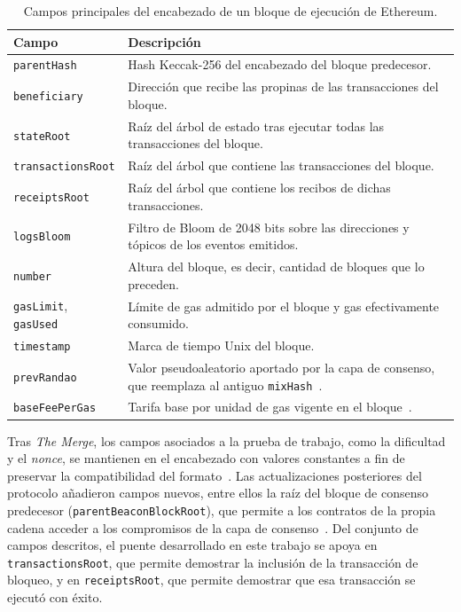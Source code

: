 \begin{table}[htbp]
	\centering
	\caption{Campos principales del encabezado de un bloque de ejecución de Ethereum.}
	\label{tab:eth_header}
	\small
	\begin{tabular}{>{\raggedright\arraybackslash}p{3.6cm} >{\raggedright\arraybackslash}p{10.6cm}}
		\toprule
		\textbf{Campo} & \textbf{Descripción} \\
		\midrule
		\texttt{parentHash} & Hash Keccak-256 del encabezado del bloque predecesor. \\
		\addlinespace
		\texttt{beneficiary} & Dirección que recibe las propinas de las transacciones del bloque. \\
		\addlinespace
		\texttt{stateRoot} & Raíz del árbol de estado tras ejecutar todas las transacciones del
		bloque. \\
		\addlinespace
		\texttt{transactionsRoot} & Raíz del árbol que contiene las transacciones del bloque. \\
		\addlinespace
		\texttt{receiptsRoot} & Raíz del árbol que contiene los recibos de dichas transacciones. \\
		\addlinespace
		\texttt{logsBloom} & Filtro de Bloom de 2048 bits sobre las direcciones y tópicos de los
		eventos emitidos. \\
		\addlinespace
		\texttt{number} & Altura del bloque, es decir, cantidad de bloques que lo preceden. \\
		\addlinespace
		\texttt{gasLimit}, \texttt{gasUsed} & Límite de gas admitido por el bloque y gas
		efectivamente consumido. \\
		\addlinespace
		\texttt{timestamp} & Marca de tiempo Unix del bloque. \\
		\addlinespace
		\texttt{prevRandao} & Valor pseudoaleatorio aportado por la capa de consenso, que reemplaza
		al antiguo \texttt{mixHash}~\cite{eip4399}. \\
		\addlinespace
		\texttt{baseFeePerGas} & Tarifa base por unidad de gas vigente en el bloque~\cite{eip1559}. \\
		\bottomrule
	\end{tabular}
\end{table}

Tras \textit{The Merge}, los campos asociados a la prueba de trabajo, como la dificultad y el
\textit{nonce}, se mantienen en el encabezado con valores constantes a fin de preservar la
compatibilidad del formato~\cite{eip3675}. Las actualizaciones posteriores del protocolo
añadieron campos nuevos, entre ellos la raíz del bloque de consenso predecesor
(\texttt{parentBeaconBlockRoot}), que permite a los contratos de la propia cadena acceder a los
compromisos de la capa de consenso~\cite{eip4788}. Del conjunto de campos descritos, el puente
desarrollado en este trabajo se apoya en \texttt{transactionsRoot}, que permite demostrar la
inclusión de la transacción de bloqueo, y en \texttt{receiptsRoot}, que permite demostrar que esa
transacción se ejecutó con éxito.

